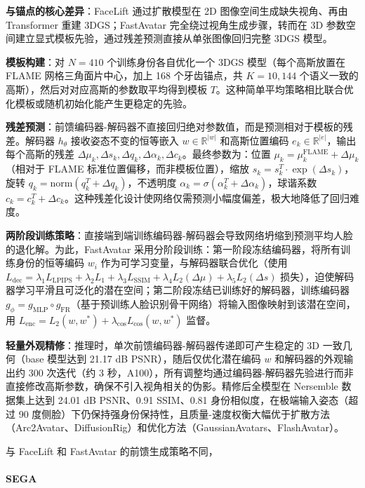 \textbf{与锚点的核心差异}：FaceLift 通过扩散模型在 2D 图像空间生成缺失视角、再由 Transformer 重建 3DGS；FastAvatar 完全绕过视角生成步骤，转而在 3D 参数空间建立显式模板先验，通过残差预测直接从单张图像回归完整 3DGS 模型。

\textbf{模板构建}：对 $N=410$ 个训练身份各自优化一个 3DGS 模型（每个高斯放置在 FLAME 网格三角面片中心，加上 168 个牙齿锚点，共 $K=10{,}144$ 个语义一致的高斯），然后对对应高斯的参数取平均得到模板 $T$。这种简单平均策略相比联合优化模板或随机初始化能产生更稳定的先验。

\textbf{残差预测}：前馈编码器-解码器不直接回归绝对参数值，而是预测相对于模板的残差。解码器 $h_\theta$ 接收姿态不变的恒等嵌入 $w \in \mathbb{R}^{|w|}$ 和高斯位置编码 $e_k \in \mathbb{R}^{|e|}$，输出每个高斯的残差 $\Delta \mu_k, \Delta s_k, \Delta q_k, \Delta \alpha_k, \Delta c_k$。最终参数为：位置 $\mu_k = \mu_k^{\text{FLAME}} + \Delta \mu_k$（相对于 FLAME 标准位置偏移，而非模板位置），缩放 $s_k = s_k^T \cdot \exp(\Delta s_k)$，旋转 $q_k = \text{norm}(q_k^T + \Delta q_k)$，不透明度 $\alpha_k = \sigma(\alpha_k^T + \Delta \alpha_k)$，球谐系数 $c_k = c_k^T + \Delta c_k$。这种残差化设计使网络仅需预测小幅度偏差，极大地降低了回归难度。

\textbf{两阶段训练策略}：直接端到端训练编码器-解码器会导致网络坍缩到预测平均人脸的退化解。为此，FastAvatar 采用分阶段训练：第一阶段冻结编码器，将所有训练身份的恒等编码 $w_i$ 作为可学习变量，与解码器联合优化（使用 $L_{\text{dec}} = \lambda_1 L_{\text{LPIPS}} + \lambda_2 L_1 + \lambda_3 L_{\text{SSIM}} + \lambda_4 L_2(\Delta \mu) + \lambda_5 L_2(\Delta s)$ 损失），迫使解码器学习平滑且可泛化的潜在空间；第二阶段冻结已训练好的解码器，训练编码器 $g_\phi = g_{\text{MLP}} \circ g_{\text{FR}}$（基于预训练人脸识别骨干网络）将输入图像映射到该潜在空间，用 $L_{\text{enc}} = L_2(w, w^*) + \lambda_{\text{cos}} L_{\text{cos}}(w, w^*)$ 监督。

\textbf{轻量外观精修}：推理时，单次前馈编码器-解码器传递即可产生稳定的 3D 一致几何（base 模型达到 21.17 dB PSNR），随后仅优化潜在编码 $w$ 和解码器的外观输出约 300 次迭代（约 3 秒，A100），所有调整均通过编码器-解码器先验进行而非直接修改高斯参数，确保不引入视角相关的伪影。精修后全模型在 Nersemble 数据集上达到 24.01 dB PSNR、0.91 SSIM、0.81 身份相似度，在极端输入姿态（超过 90 度侧脸）下仍保持强身份保持性，且质量-速度权衡大幅优于扩散方法（Arc2Avatar、DiffusionRig）和优化方法（GaussianAvatars、FlashAvatar）。

与 FaceLift 和 FastAvatar 的前馈生成策略不同，

\paragraph{SEGA}

